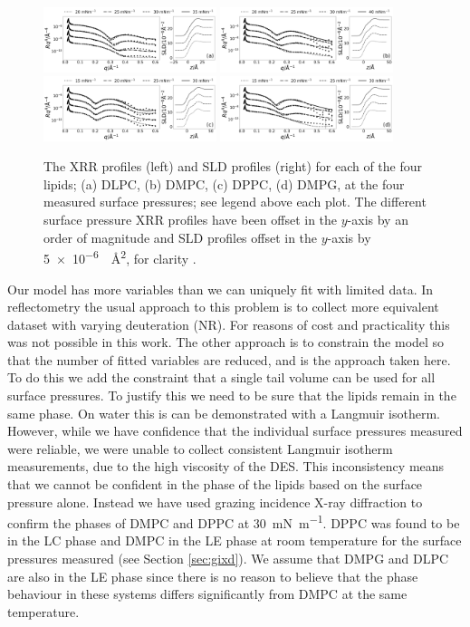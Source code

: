 \documentclass[amsmath,amssymb,twocolumn,superscriptaddress,aps,prl]{revtex4-1}
\begin{document}
%
\begin{figure}
	\centering
  \includegraphics[width=0.45\textwidth]{figures/dlpc_ref_sld}
	\includegraphics[width=0.45\textwidth]{figures/dmpc_ref_sld}
	\includegraphics[width=0.45\textwidth]{figures/dppc_ref_sld}
	\includegraphics[width=0.45\textwidth]{figures/dmpg_ref_sld}
	\caption{\small The XRR profiles (left) and SLD profiles (right) for each
  of the four lipids; (a) DLPC, (b) DMPC, (c) DPPC, (d) DMPG, at the four
  measured surface pressures; see legend above each plot. The different
  surface pressure XRR profiles have been offset in the $y$-axis by an order
  of magnitude and SLD profiles offset in the $y$-axis by
  \SI{5e-6}{\per\square\angstrom}, for clarity \cite{SI2018}.}
	\label{fig:lipids}
\end{figure}
%
Our model has more variables than we can uniquely fit with limited data.
In reflectometry the usual approach to this problem is to collect more
equivalent dataset with varying deuteration (NR). For reasons of cost and
practicality this was not possible in this work.
The other approach is to constrain the model so that the number of fitted
variables are reduced, and is the approach taken here.
To do this we add the constraint that a single tail volume can be used for
all surface pressures. To justify this we need to be sure that the lipids
remain in the same phase. On water this is can be demonstrated with a
Langmuir isotherm.
However, while we have confidence that the individual surface pressures
measured were reliable, we were unable to collect consistent Langmuir
isotherm measurements, due to the high viscosity of the DES.
This inconsistency means that we cannot be confident in the phase of the
lipids based on the surface pressure alone.
Instead we have used grazing incidence X-ray diffraction to confirm the
phases of DMPC and DPPC at \SI{30}{\milli\newton\per\meter}.
DPPC was found to be in the LC phase and DMPC in the LE phase at room
temperature for the surface pressures measured (see Section \ref{sec:gixd}).
We assume that DMPG and DLPC are also in the LE phase since there is no
reason to believe that the phase behaviour in these systems differs
significantly from DMPC at the same temperature.
\end{document}
